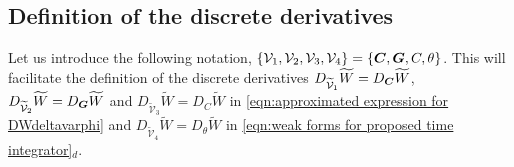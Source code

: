 

\subsection{Definition of the discrete derivatives}

Let us introduce the following notation, $\{\mathcal{V}_{1},\mathcal{V}_2,\mathcal{V}_3,\mathcal{V}_4\} = \{\boldsymbol{C},\boldsymbol{G},C,\theta\}$. This will facilitate the definition of the discrete derivatives $D_{\widetilde{\mathcal{V}}_1}\widetilde{W} = D_{\boldsymbol{C}}\widetilde{W}$, $D_{\widetilde{\mathcal{V}}_2}\widetilde{W} = D_{\boldsymbol{G}}\widetilde{W}$ and $D_{\widetilde{\mathcal{V}}_3}\widetilde{W} = D_{{C}}\widetilde{W}$ in \eqref{eqn:approximated expression for DWdeltavarphi} and $D_{\widetilde{\mathcal{V}}_4}\widetilde{W} = D_{\theta}\widetilde{W}$ in \eqref{eqn:weak forms for proposed time integrator}$_d$.


